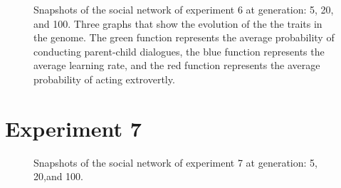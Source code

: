 \begin{figure}[htbp]
    \caption{Snapshots of the social network of experiment 6 at generation:  5,  20, and  100.  Three graphs that show the evolution of the the traits in the genome. The green function represents the average probability of conducting parent-child dialogues, the blue function represents the average learning rate, and the red function represents the average probability of acting extrovertly.}
\end{figure}

\clearpage
\section{Experiment 7}
\begin{figure}[htbp]
    \centering
    \hfill
    \par \bigskip
    \caption{Snapshots of the social network of experiment 7 at generation:  5,  20,and  100.}
\end{figure}
